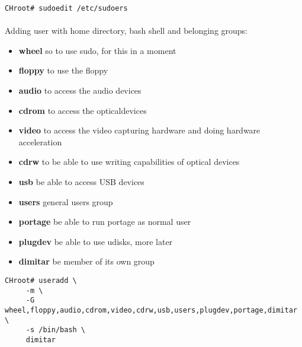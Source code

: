 \documentclass[11pt,a4paper]{article}
\begin{document}
                    \begin{lstlisting}[style=BashInputCHRoot]
 CHroot# sudoedit /etc/sudoers
                    \end{lstlisting}

                    

                    \paragraph{} Adding user with home directory, bash shell and belonging groups:

                    \begin{itemize}
                        \item \textbf{wheel} so to use sudo, for this in a moment
                        \item \textbf{floppy} to use the floppy
                        \item \textbf{audio} to access the audio devices
                        \item \textbf{cdrom} to access the opticaldevices
                        \item \textbf{video} to access the video capturing hardware and doing hardware acceleration
                        \item \textbf{cdrw} to be able to use writing capabilities of optical devices
                        \item \textbf{usb} be able to access USB devices
                        \item \textbf{users} general users group
                        \item \textbf{portage} be able to run portage as normal user
                        \item \textbf{plugdev} be able to use udisks, more later
                        \item \textbf{dimitar} be member of its own group
                    \end{itemize}

                    \begin{lstlisting}[style=BashInputCHRoot]
 CHroot# useradd \
     -m \
     -G wheel,floppy,audio,cdrom,video,cdrw,usb,users,plugdev,portage,dimitar \
     -s /bin/bash \
     dimitar
                    \end{lstlisting}
\end{document}
